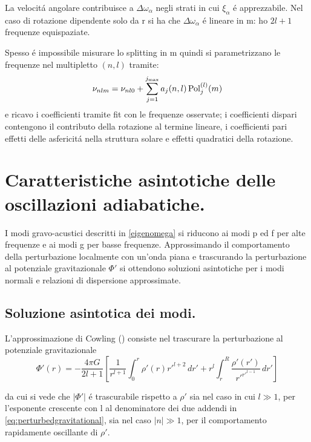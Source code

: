 \documentclass[../main.tex]{subfiles}
\begin{document}
La velocit\'a angolare contribuisce a $\Delta\omega_{\alpha}$ negli strati in cui $\xi_{\alpha}$ \'e apprezzabile. Nel caso di rotazione dipendente solo da r si ha che $\Delta\omega_{\alpha}$ \'e lineare in m: ho $2l+1$ frequenze equispaziate.

Spesso \'e impossibile misurare lo splitting in m quindi si parametrizzano le frequenze nel multipletto $(n,l)$ tramite:
\begin{equation}
\nu_{nlm}=\nu_{nl0}+\sum_{j=1}^{j_{\max}}a_j(n,l)\operatorname{Pol}_j^{(l)}(m)\label{eq:freqmulti}
\end{equation}
e ricavo i coefficienti tramite fit con le frequenze osservate; i coefficienti dispari contengono il contributo della rotazione al termine lineare, i coefficienti pari effetti delle asfericit\'a nella struttura solare e effetti quadratici della rotazione.


{\let\clearpage\relax\let\cleardoublepage\relax           %
\chapter{Caratteristiche asintotiche delle oscillazioni adiabatiche.}\label{chap:asyntoticbehavour}
}

I modi gravo-acustici descritti in \eqref{eigenomega} si riducono ai modi p ed f per alte frequenze e ai modi g per basse frequenze. Approssimando il comportamento della perturbazione localmente con un'onda piana e trascurando la perturbazione al potenziale gravitazionale $\Phi'$ si ottendono soluzioni asintotiche per i modi normali e relazioni di dispersione approssimate.

\section{Soluzione asintotica dei modi.}

L'approssimazione di Cowling (\cite{cow41oscillations}) consiste nel trascurare la perturbazione al potenziale gravitazionale
\begin{equation}
\Phi'(r)=-\frac{4\pi G}{2l+1}\left[\frac{1}{r^{l+1}}\int_0^r\rho'(r)r'^{l+2}\,dr'+r^l\int_r^R\frac{\rho'(r')}{r'^{r'^{l-1}}}\,dr'\right]\label{eq:perturbedgravitational}
\end{equation}

da cui si vede che $|\Phi'|$ \'e trascurabile rispetto a $\rho'$ sia nel caso in cui $l\gg1$, per l'esponente crescente con l al denominatore dei due addendi in \eqref{eq:perturbedgravitational}, sia nel caso $|n|\gg1$, per il comportamento rapidamente oscillante di $\rho'$.
\end{document}
